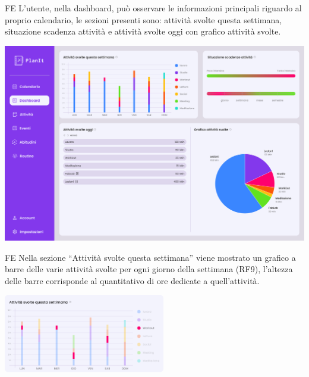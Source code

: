 \begin{listaPersonale}{FE}
     L’utente, nella dashboard, può osservare le informazioni principali riguardo al proprio calendario, le sezioni presenti sono: attività svolte questa settimana, situazione scadenza attività e attività svolte oggi con grafico attività svolte.
    \begin{center}
        \includegraphics[width=1\textwidth]{img/FrontEnd/Dashboard/Dashboard.png}
    \end{center}
    
    \begin{listaPersonale2}{FE}
         Nella sezione “Attività svolte questa settimana” viene mostrato un grafico a barre delle varie attività svolte per ogni giorno della settimana (RF9), l’altezza delle barre corrisponde al quantitativo di ore dedicate a quell’attività.
        \begin{center}
            \includegraphics[width=0.53\textwidth,height=0.18\textheight]{img/FrontEnd/Dashboard/graficoBarre.png} %
        \end{center}
        

\end{listaPersonale2}
\end{listaPersonale}

